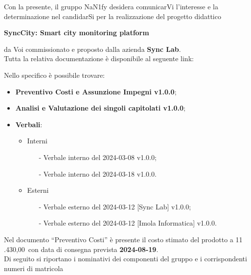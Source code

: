 Con la presente, il gruppo NaN1fy desidera comunicarVi l'interesse e la determinazione nel candidarSi per la realizzazione del progetto didattico \\
\begin{center}
	\textbf{SyncCity: Smart city monitoring platform}
\end{center}
da Voi commissionato e proposto dalla azienda \textbf{Sync Lab}.
\vspace{1em}
\\Tutta la relativa documentazione è disponibile al seguente link: 
\begin{center}
	\textbf{\href{https://github.com/NaN1fy/docs/tree/main/documents/candidatura}{\color{myblue}{https://github.com/NaN1fy/docs/tree/main/documents/candidatura}}}
\end{center}
Nello specifico è possibile trovare:
\begin{itemize}
	\item \textbf{Preventivo Costi e Assunzione Impegni v1.0.0};
	\item \textbf{Analisi e Valutazione dei singoli capitolati v1.0.0};
	\item \textbf{Verbali}: 
		\begin{itemize}
			\item Interni 
				\begin{itemize}
					\item[-] Verbale interno del 2024-03-08 v1.0.0;
					\item[-] Verbale interno del 2024-03-18 v1.0.0.
				\end{itemize}
			\item Esterni
				\begin{itemize}
					\item[-] Verbale esterno del 2024-03-12 [Sync Lab] v1.0.0;
					\item[-] Verbale esterno del 2024-03-12 [Imola Informatica] v1.0.0.
				\end{itemize}
		\end{itemize}
\end{itemize}
\vspace{1em}
Nel documento “Preventivo Costi” è presente il costo stimato del prodotto a 11 .430,00\;\texteuro\ con data di consegna prevista \textbf{2024-08-19}.\\
\vspace{1em}
Di seguito si riportano i nominativi dei componenti del gruppo e i corrispondenti numeri di matricola\\

